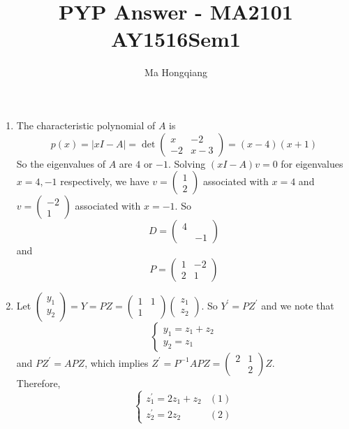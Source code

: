 \documentclass[12pt]{article}
\theoremstyle{definition}
\begin{document}
\title{PYP Answer - MA2101 AY1516Sem1}
\author{Ma Hongqiang}
\maketitle
\begin{enumerate}
\item The characteristic polynomial of $A$ is
\[
p(x)=|xI-A| = \det\begin{pmatrix}x&-2\\-2&x-3\end{pmatrix} = (x-4)(x+1)
\]
So the eigenvalues of $A$ are $4$ or $-1$. Solving $(xI-A)v=0$ for eigenvalues $x=4,-1$ respectively, we have $v=\begin{pmatrix}1\\2\end{pmatrix}$ associated with $x=4$ and $v=\begin{pmatrix}-2\\1\end{pmatrix}$ associated with $x=-1$. So
\[
D=\begin{pmatrix}4&\\&-1\end{pmatrix}
\]
and
\[
P=\begin{pmatrix}1&-2\\2&1\end{pmatrix}
\]
\item Let $\begin{pmatrix}y_1\\y_2\end{pmatrix} = Y=PZ=\begin{pmatrix}1&1\\1&\end{pmatrix}\begin{pmatrix} z_1\\z_2\end{pmatrix}$. So $Y^\prime = PZ^\prime$ and we note that
\[
\begin{cases}
y_1 = z_1+z_2\\
y_2 = z_1
\end{cases}
\]
and $PZ^\prime = APZ$, which implies $Z^\prime = P^{-1}APZ = \begin{pmatrix}2&1\\&2\end{pmatrix}Z$.\\
Therefore,
\[
\begin{cases}
z_1^\prime = 2z_1+z_2 &(1)\\
z_2^\prime = 2z_2&(2)
\end{cases}
\]
\end{enumerate}
\end{document}
